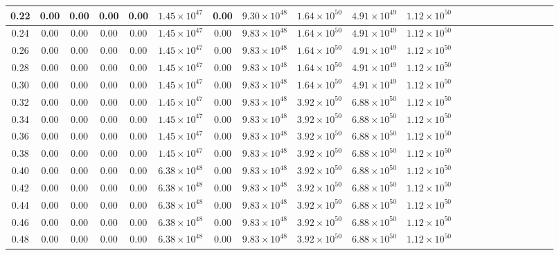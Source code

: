 \begin{table*}
\begin{tabular}{ccccccccccccccccccccc}
\hline
0.22  &0.00 &0.00 &0.00 &0.00 &$1.45\times 10^{47}$ &0.00 &$9.30\times 10^{48}$ &$1.64\times 10^{50}$ &$4.91\times 10^{49}$ &$1.12\times 10^{50}$ \\
\hline
0.24  &0.00 &0.00 &0.00 &0.00 &$1.45\times 10^{47}$ &0.00 &$9.83\times 10^{48}$ &$1.64\times 10^{50}$ &$4.91\times 10^{49}$ &$1.12\times 10^{50}$ \\
\hline
0.26  &0.00 &0.00 &0.00 &0.00 &$1.45\times 10^{47}$ &0.00 &$9.83\times 10^{48}$ &$1.64\times 10^{50}$ &$4.91\times 10^{49}$ &$1.12\times 10^{50}$ \\
\hline
0.28  &0.00 &0.00 &0.00 &0.00 &$1.45\times 10^{47}$ &0.00 &$9.83\times 10^{48}$ &$1.64\times 10^{50}$ &$4.91\times 10^{49}$ &$1.12\times 10^{50}$ \\
\hline
0.30  &0.00 &0.00 &0.00 &0.00 &$1.45\times 10^{47}$ &0.00 &$9.83\times 10^{48}$ &$1.64\times 10^{50}$ &$4.91\times 10^{49}$ &$1.12\times 10^{50}$ \\
\hline
0.32  &0.00 &0.00 &0.00 &0.00 &$1.45\times 10^{47}$ &0.00 &$9.83\times 10^{48}$ &$3.92\times 10^{50}$ &$6.88\times 10^{50}$ &$1.12\times 10^{50}$ \\
\hline
0.34  &0.00 &0.00 &0.00 &0.00 &$1.45\times 10^{47}$ &0.00 &$9.83\times 10^{48}$ &$3.92\times 10^{50}$ &$6.88\times 10^{50}$ &$1.12\times 10^{50}$ \\
\hline
0.36  &0.00 &0.00 &0.00 &0.00 &$1.45\times 10^{47}$ &0.00 &$9.83\times 10^{48}$ &$3.92\times 10^{50}$ &$6.88\times 10^{50}$ &$1.12\times 10^{50}$ \\
\hline
0.38  &0.00 &0.00 &0.00 &0.00 &$1.45\times 10^{47}$ &0.00 &$9.83\times 10^{48}$ &$3.92\times 10^{50}$ &$6.88\times 10^{50}$ &$1.12\times 10^{50}$ \\
\hline
0.40  &0.00 &0.00 &0.00 &0.00 &$6.38\times 10^{48}$ &0.00 &$9.83\times 10^{48}$ &$3.92\times 10^{50}$ &$6.88\times 10^{50}$ &$1.12\times 10^{50}$ \\
\hline
0.42  &0.00 &0.00 &0.00 &0.00 &$6.38\times 10^{48}$ &0.00 &$9.83\times 10^{48}$ &$3.92\times 10^{50}$ &$6.88\times 10^{50}$ &$1.12\times 10^{50}$ \\
\hline
0.44  &0.00 &0.00 &0.00 &0.00 &$6.38\times 10^{48}$ &0.00 &$9.83\times 10^{48}$ &$3.92\times 10^{50}$ &$6.88\times 10^{50}$ &$1.12\times 10^{50}$ \\
\hline
0.46  &0.00 &0.00 &0.00 &0.00 &$6.38\times 10^{48}$ &0.00 &$9.83\times 10^{48}$ &$3.92\times 10^{50}$ &$6.88\times 10^{50}$ &$1.12\times 10^{50}$ \\
\hline
0.48  &0.00 &0.00 &0.00 &0.00 &$6.38\times 10^{48}$ &0.00 &$9.83\times 10^{48}$ &$3.92\times 10^{50}$ &$6.88\times 10^{50}$ &$1.12\times 10^{50}$ \\

\end{tabular}
\end{table*}
